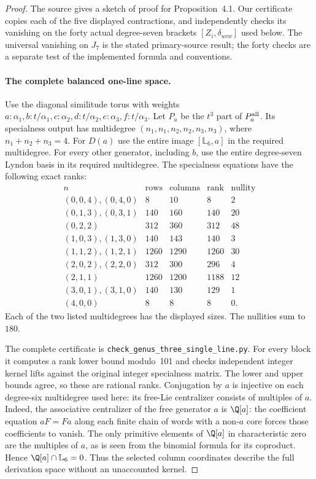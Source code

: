 \begin{proof}
The source gives a sketch of proof for Proposition~4.1. Our certificate
copies each of the five displayed contractions, and independently
checks its vanishing on the forty actual degree-seven brackets
$[Z_i,\delta_{uvw}]$ used below. The universal vanishing on $J_7$
is the stated primary-source result; the forty checks are a separate
test of the implemented formula and conventions.

\paragraph{The complete balanced one-line space.}
Use the diagonal similitude torus with weights
$a:\alpha_1,b:t/\alpha_1,c:\alpha_2,d:t/\alpha_2,
e:\alpha_3,f:t/\alpha_3$. Let $P_a$ be the $t^3$ part of
$P_a^{\rm all}$. Its specialness output has multidegree
$(n_1,n_1,n_2,n_2,n_3,n_3)$, where $n_1+n_2+n_3=4$.
For $D(a)$ use the entire image $[\mathbb L_6,a]$ in the
required multidegree. For every other generator, including $b$,
use the entire degree-seven Lyndon basis in its required multidegree.
The specialness equations have the following exact ranks:
\[
\begin{array}{c|r|r|r|r}
n&\text{rows}&\text{columns}&\text{rank}&\text{nullity}\\\hline
(0,0,4),(0,4,0)&8&10&8&2\\
(0,1,3),(0,3,1)&140&160&140&20\\
(0,2,2)&312&360&312&48\\
(1,0,3),(1,3,0)&140&143&140&3\\
(1,1,2),(1,2,1)&1260&1290&1260&30\\
(2,0,2),(2,2,0)&312&300&296&4\\
(2,1,1)&1260&1200&1188&12\\
(3,0,1),(3,1,0)&140&130&129&1\\
(4,0,0)&8&8&8&0.
\end{array}                                                   \tag{SL.5}
\]
Each of the two listed multidegrees has the displayed sizes.
The nullities sum to $180$.

The complete certificate is
\texttt{check\_genus\_three\_}\allowbreak\texttt{single\_line.py}.
For every block it computes a rank lower bound modulo~101 and
checks independent integer kernel lifts against the original
integer specialness matrix. The lower and upper bounds agree,
so these are rational ranks. Conjugation by $a$ is injective on
each degree-six multidegree used here: its free-Lie centralizer
consists of multiples of $a$. Indeed, the associative centralizer
of the free generator $a$ is $\Q[a]$: the coefficient equation
$aF=Fa$ along each finite chain of words with a non-$a$ core
forces those coefficients to vanish. The only primitive elements
of $\Q[a]$ in characteristic zero are the multiples of $a$,
as is seen from the binomial formula for its coproduct.
Hence $\Q[a]\cap\mathbb L_6=0$. Thus the selected column coordinates
describe the full derivation space without an unaccounted kernel.


\end{proof}

